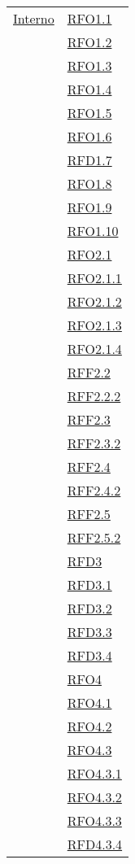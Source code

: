 \begin{longtable}{|>{\centering}m{5cm}|m{5cm}<{\centering}|}
\hline
\hyperlink{Interno}{Interno} 
& \hyperlink{RFO1.1}{RFO1.1}\\
& \hyperlink{RFO1.2}{RFO1.2}\\
& \hyperlink{RFO1.3}{RFO1.3}\\
& \hyperlink{RFO1.4}{RFO1.4}\\
& \hyperlink{RFO1.5}{RFO1.5}\\
& \hyperlink{RFO1.6}{RFO1.6}\\
& \hyperlink{RFD1.7}{RFD1.7}\\
& \hyperlink{RFO1.8}{RFO1.8}\\
& \hyperlink{RFO1.9}{RFO1.9}\\
& \hyperlink{RFO1.10}{RFO1.10}\\
& \hyperlink{RFO2.1}{RFO2.1}\\
& \hyperlink{RFO2.1.1}{RFO2.1.1}\\
& \hyperlink{RFO2.1.2}{RFO2.1.2}\\
& \hyperlink{RFO2.1.3}{RFO2.1.3}\\
& \hyperlink{RFO2.1.4}{RFO2.1.4}\\
& \hyperlink{RFF2.2}{RFF2.2}\\
& \hyperlink{RFF2.2.2}{RFF2.2.2}\\
& \hyperlink{RFF2.3}{RFF2.3}\\
& \hyperlink{RFF2.3.2}{RFF2.3.2}\\
& \hyperlink{RFF2.4}{RFF2.4}\\
& \hyperlink{RFF2.4.2}{RFF2.4.2}\\
& \hyperlink{RFF2.5}{RFF2.5}\\
& \hyperlink{RFF2.5.2}{RFF2.5.2}\\
& \hyperlink{RFD3}{RFD3}\\
& \hyperlink{RFD3.1}{RFD3.1}\\
& \hyperlink{RFD3.2}{RFD3.2}\\
& \hyperlink{RFD3.3}{RFD3.3}\\
& \hyperlink{RFD3.4}{RFD3.4}\\
& \hyperlink{RFO4}{RFO4}\\
& \hyperlink{RFO4.1}{RFO4.1}\\
& \hyperlink{RFO4.2}{RFO4.2}\\
& \hyperlink{RFO4.3}{RFO4.3}\\
& \hyperlink{RFO4.3.1}{RFO4.3.1}\\
& \hyperlink{RFO4.3.2}{RFO4.3.2}\\
& \hyperlink{RFO4.3.3}{RFO4.3.3}\\
& \hyperlink{RFD4.3.4}{RFD4.3.4}\\

\end{longtable}
